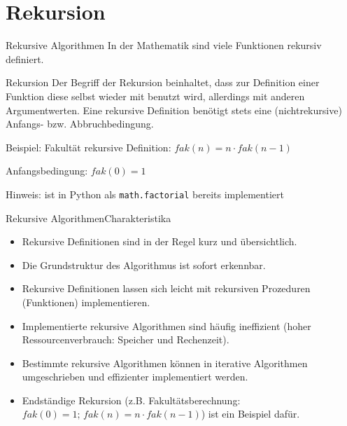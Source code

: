 \documentclass[xelatex,aspectratio=169]{beamer}
\begin{document}
\section{Rekursion}

\begin{frame}{Rekursive Algorithmen}
  In der Mathematik sind viele Funktionen rekursiv definiert.
  \begin{block}{Rekursion}
    Der Begriff der Rekursion beinhaltet, dass zur Definition einer Funktion diese selbst wieder mit benutzt wird, allerdings mit
    anderen Argumentwerten. Eine rekursive Definition benötigt stets eine (nichtrekursive) Anfangs- bzw. Abbruchbedingung.
  \end{block}
  \begin{exampleblock}{Beispiel: Fakultät}
    rekursive Definition: \(fak(n) = n \cdot fak(n-1)\)

    Anfangsbedingung: \(fak(0) = 1\)

    Hinweis: ist in Python als \texttt{math.factorial} bereits implementiert
  \end{exampleblock}
\end{frame}

\begin{frame}{Rekursive Algorithmen}{Charakteristika}
  \begin{itemize}
    \item Rekursive Definitionen sind in der Regel kurz und übersichtlich.
    \item Die Grundstruktur des Algorithmus ist sofort erkennbar.
    \item Rekursive Definitionen lassen sich leicht mit rekursiven Prozeduren (Funktionen) implementieren.
    \item Implementierte rekursive Algorithmen sind häufig ineffizient (hoher Ressourcenverbrauch: Speicher und Rechenzeit).
    \item Bestimmte rekursive Algorithmen können in iterative Algorithmen umgeschrieben und effizienter implementiert werden.
    \item Endständige Rekursion (z.B. Fakultätsberechnung: \(fak(0) = 1; \, fak(n) = n \cdot fak(n-1)\)) ist ein Beispiel dafür.
  \end{itemize}
\end{frame}
\end{document}
